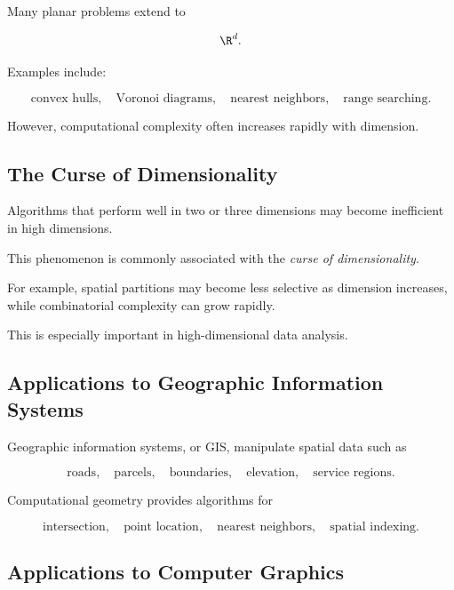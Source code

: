 Many planar problems extend to

\[
\R^d.
\]

Examples include:

\[
\boxed{
\text{convex hulls},
\quad
\text{Voronoi diagrams},
\quad
\text{nearest neighbors},
\quad
\text{range searching}.
}
\]

However, computational complexity often increases rapidly with dimension.

\subsection{The Curse of Dimensionality}
\label{subsec:geometry-curse-dimensionality}

Algorithms that perform well in two or three dimensions may become
inefficient in high dimensions.

This phenomenon is commonly associated with the
\emph{curse of dimensionality}.

For example, spatial partitions may become less selective as dimension
increases, while combinatorial complexity can grow rapidly.

This is especially important in high-dimensional data analysis.

\subsection{Applications to Geographic Information Systems}
\label{subsec:computational-geometry-gis}

Geographic information systems, or GIS, manipulate spatial data such as

\[
\boxed{
\text{roads},
\quad
\text{parcels},
\quad
\text{boundaries},
\quad
\text{elevation},
\quad
\text{service regions}.
}
\]

Computational geometry provides algorithms for

\[
\boxed{
\text{intersection},
\quad
\text{point location},
\quad
\text{nearest neighbors},
\quad
\text{spatial indexing}.
}
\]

\subsection{Applications to Computer Graphics}
\label{subsec:computational-geometry-graphics}

